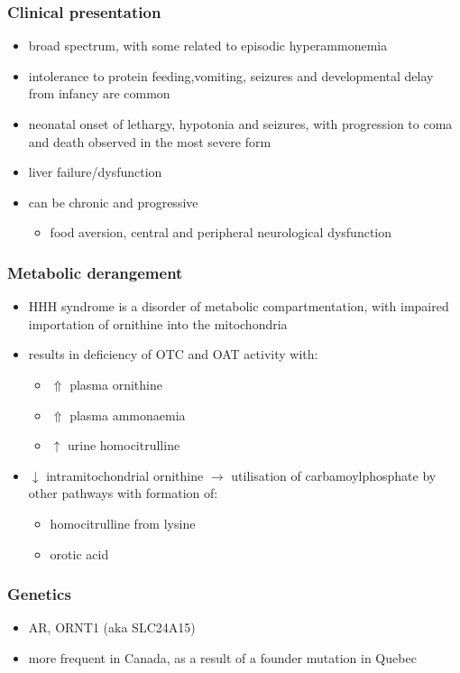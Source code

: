 \documentclass{scrartcl}
\begin{document}
\subsubsection{Clinical presentation}
\label{sec:org02dfe65}
\begin{itemize}
\item broad spectrum, with some related to episodic hyperammonemia
\item intolerance to protein feeding,vomiting, seizures and developmental
delay from infancy are common
\item neonatal onset of lethargy, hypotonia and seizures, with progression
to coma and death observed in the most severe form
\item liver failure/dysfunction
\item can be chronic and progressive
\begin{itemize}
\item food aversion, central and peripheral neurological dysfunction
\end{itemize}
\end{itemize}

\subsubsection{Metabolic derangement}
\label{sec:org248ea82}
\begin{itemize}
\item HHH syndrome is a disorder of metabolic compartmentation, with
impaired importation of ornithine into the mitochondria
\item results in deficiency of OTC and OAT activity with:
\begin{itemize}
\item \(\Uparrow\) plasma ornithine
\item \(\Uparrow\) plasma ammonaemia
\item \(\uparrow\) urine homocitrulline
\end{itemize}
\item \(\downarrow\) intramitochondrial ornithine \(\to\) utilisation of
carbamoylphosphate by other pathways with formation of:
\begin{itemize}
\item homocitrulline from lysine
\item orotic acid
\end{itemize}
\end{itemize}
\subsubsection{Genetics}
\label{sec:org529c17a}
\begin{itemize}
\item AR, ORNT1 (aka SLC24A15)
\item more frequent in Canada, as a result of a founder mutation in Quebec
\end{itemize}
\end{document}
